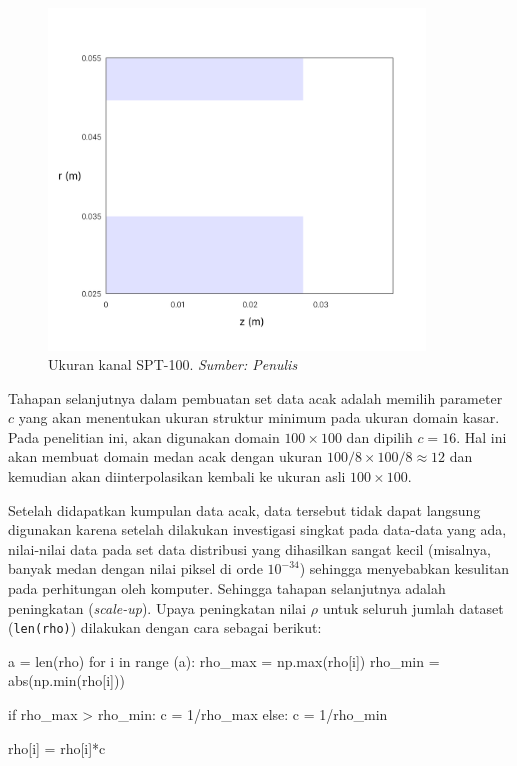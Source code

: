 \begin{figure}[h!]
    \centering
    \includegraphics[width=10cm]{gambar/domain spt100 ukuran.png}
    \caption{Ukuran kanal SPT-100. \emph{ Sumber: Penulis}}
    \label{ukuran spt 100}
\end{figure}

Tahapan selanjutnya dalam pembuatan set data acak adalah memilih parameter $c$ yang akan menentukan ukuran struktur minimum pada ukuran domain kasar. Pada penelitian ini, akan digunakan domain $100 \times 100$ dan dipilih $c = 16$. Hal ini akan membuat domain medan acak dengan ukuran $100/8 \times 100/8 \approx 12$ dan kemudian akan diinterpolasikan kembali ke ukuran asli $100 \times 100$.

Setelah didapatkan kumpulan data acak, data tersebut tidak dapat langsung digunakan karena setelah dilakukan investigasi singkat pada data-data yang ada, nilai-nilai data pada set data distribusi yang dihasilkan sangat kecil (misalnya, banyak medan dengan nilai piksel di orde $10^{-34}$) sehingga menyebabkan kesulitan pada perhitungan oleh komputer. Sehingga tahapan selanjutnya adalah peningkatan (\textit{scale-up}). Upaya peningkatan nilai $\rho$ untuk seluruh jumlah dataset (\texttt{len(rho)}) dilakukan dengan cara sebagai berikut:

\begin{mypythoncode}
a = len(rho) 
for i in range (a):
    rho_max = np.max(rho[i])
    rho_min = abs(np.min(rho[i]))
    
    if rho_max > rho_min:
        c = 1/rho_max
    else:
        c = 1/rho_min
    
    rho[i] = rho[i]*c
\end{mypythoncode}

